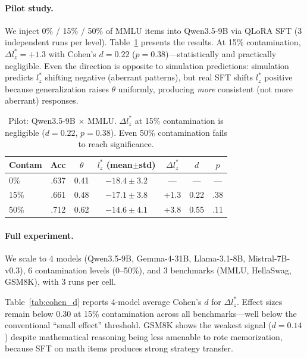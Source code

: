 \documentclass[11pt,a4paper]{article}
\begin{document}
\paragraph{Pilot study.}
We inject 0\% / 15\% / 50\% of MMLU items into Qwen3.5-9B via QLoRA SFT (3 independent runs per level).
Table~\ref{tab:pilot} presents the results.
At 15\% contamination, $\Delta l_{z}^{*} = +1.3$ with Cohen's $d = 0.22$ ($p = 0.38$)---statistically and practically negligible.
Even the direction is opposite to simulation predictions: simulation predicts $l_{z}^{*}$ shifting negative (aberrant patterns), but real SFT shifts $l_{z}^{*}$ positive because generalization raises $\theta$ uniformly, producing \emph{more} consistent (not more aberrant) responses.

\begin{table}[t]
\centering
\small
\begin{tabular}{lcccccc}
\toprule
Contam & Acc & $\theta$ & $l_{z}^{*}$ (mean$\pm$std) & $\Delta l_{z}^{*}$ & $d$ & $p$ \\
\midrule
0\% & .637 & 0.41 & $-18.4 \pm 3.2$ & --- & --- & --- \\
15\% & .661 & 0.48 & $-17.1 \pm 3.8$ & +1.3 & 0.22 & .38 \\
50\% & .712 & 0.62 & $-14.6 \pm 4.1$ & +3.8 & 0.55 & .11 \\
\bottomrule
\end{tabular}
\caption{Pilot: Qwen3.5-9B $\times$ MMLU. $\Delta l_{z}^{*}$ at 15\% contamination is negligible ($d=0.22$, $p=0.38$). Even 50\% contamination fails to reach significance.}
\label{tab:pilot}
\end{table}

\paragraph{Full experiment.}
We scale to 4 models (Qwen3.5-9B, Gemma-4-31B, Llama-3.1-8B, Mistral-7B-v0.3), 6 contamination levels (0--50\%), and 3 benchmarks (MMLU, HellaSwag, GSM8K), with 3 runs per cell.

Table~\ref{tab:cohen_d} reports 4-model average Cohen's $d$ for $\Delta l_{z}^{*}$.
Effect sizes remain below 0.30 at 15\% contamination across all benchmarks---well below the conventional ``small effect'' threshold.
GSM8K shows the weakest signal ($d = 0.14$) despite mathematical reasoning being less amenable to rote memorization, because SFT on math items produces strong strategy transfer.
\end{document}
